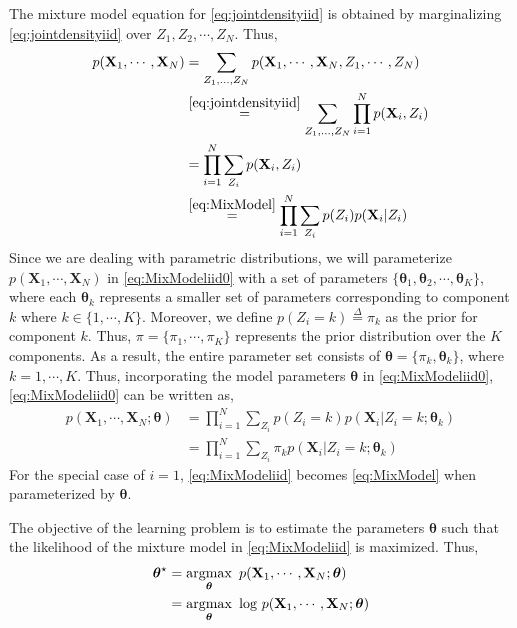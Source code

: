 \documentclass[twoside,11pt,a4paper]{book}
\newcommand{\data}[1]{\mathbf{#1}}
\begin{document}
The mixture model equation for \eqref{eq:jointdensityiid} is obtained by marginalizing \eqref{eq:jointdensityiid} over $Z_{1}, Z_{2}, \cdots, Z_{N}$. Thus,
\begin{align}
p(\data{X}_{1}, \cdots, \data{X}_{N}) &= \sum_{Z_{1}, ... , Z_{N}} p(\data{X}_{1}, \cdots, \data{X}_{N},Z_{1}, \cdots, Z_{N}) \nonumber \\
 & \stackrel{\eqref{eq:jointdensityiid}}{=} \sum_{Z_{1}, ... , Z_{N}} \prod_{i=1}^{N} p(\data{X}_{i}, Z_{i}) \nonumber \\
 & = \prod_{i=1}^{N} \sum_{Z_{i}} p(\data{X}_{i}, Z_{i}) \nonumber \\
&  \stackrel{\eqref{eq:MixModel}}{=} \prod_{i=1}^{N} \sum_{Z_{i}} p(Z_{i}) p(\data{X}_{i}|Z_{i}) \label{eq:MixModeliid0}
\end{align}
Since we are dealing with parametric distributions, we will parameterize $p(\data{X}_{1}, \cdots, \data{X}_{N})$ in \eqref{eq:MixModeliid0} with a set of parameters $\{\bm{\theta}_{1}, \bm{\theta}_{2}, \cdots, \bm{\theta}_{K}\}$, where each $\bm{\theta}_{k}$ represents a smaller set of parameters corresponding to component $k$ where $k \in \{1, \cdots, K\}$. Moreover, we define $p(Z_{i} = k) \stackrel{\Delta}{=} \pi_{k}$ as the prior for component $k$. Thus, $\pi = \{\pi_{1}, \cdots, \pi_{K}\}$ represents the prior distribution over the $K$ components. As a result, the entire parameter set consists of $\bm{\theta} = \{\pi_{k}, \bm{\theta}_{k}\}$, where $k = 1, \cdots, K$. Thus, incorporating the model parameters $\bm{\theta}$ in \eqref{eq:MixModeliid0},  \eqref{eq:MixModeliid0} can be written as,
\begin{align}
p(\data{X}_{1}, \cdots, \data{X}_{N}; \bm{\theta}) &= \prod_{i=1}^{N} \sum_{Z_{i}} p(Z_{i} = k) p(\data{X}_{i}|Z_{i} = k; \bm{\theta}_{k}) \nonumber \\ 
&= \prod_{i=1}^{N} \sum_{Z_{i}} \pi_{k} p(\data{X}_{i}|Z_{i} = k; \bm{\theta}_{k}) \label{eq:MixModeliid}
\end{align}
For the special case of $i=1$, \eqref{eq:MixModeliid} becomes \eqref{eq:MixModel} when parameterized by $\bm{\theta}$. 

The objective of the learning problem is to estimate the parameters $\bm{\theta}$ such that the likelihood of the mixture model in \eqref{eq:MixModeliid} is maximized. Thus,
\begin{align}
\bm{\theta}^{\star} &= \argmax_{\bm{\theta}} \ p(\data{X}_{1}, \cdots, \data{X}_{N}; \bm{\theta}) \nonumber \\
                    &= \argmax_{\bm{\theta}} \ \text{log} \ p(\data{X}_{1}, \cdots, \data{X}_{N}; \bm{\theta}) \label{eq:MixModelLearningProblem}
\end{align}
\end{document}
